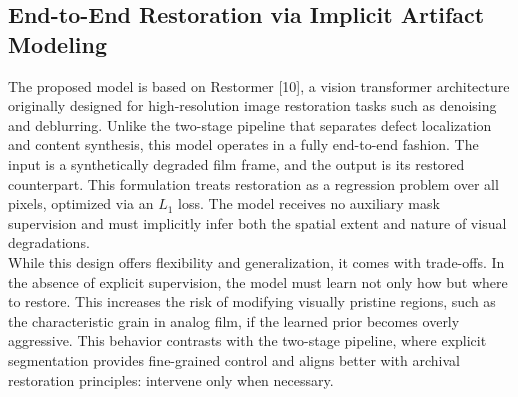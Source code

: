 \documentclass[10pt,a4paper,twocolumn,twoside]{article}
\begin{document}
\subsection{End-to-End Restoration via Implicit Artifact Modeling}
The proposed model is based on Restormer [10], a vision transformer architecture originally designed for high-resolution image restoration tasks such as denoising and deblurring. Unlike the two-stage pipeline that separates defect localization and content synthesis, this model operates in a fully end-to-end fashion. The input is a synthetically degraded film frame, and the output is its restored counterpart.
This formulation treats restoration as a regression problem over all pixels, optimized via an $L_1$ loss. The model receives no auxiliary mask supervision and must implicitly infer both the spatial extent and nature of visual degradations. \\
While this design offers flexibility and generalization, it comes with trade-offs. In the absence of explicit supervision, the model must learn not only how but where to restore. This increases the risk of modifying visually pristine regions, such as the characteristic grain in analog film, if the learned prior becomes overly aggressive. This behavior contrasts with the two-stage pipeline, where explicit segmentation provides fine-grained control and aligns better with archival restoration principles: intervene only when necessary.
\end{document}
